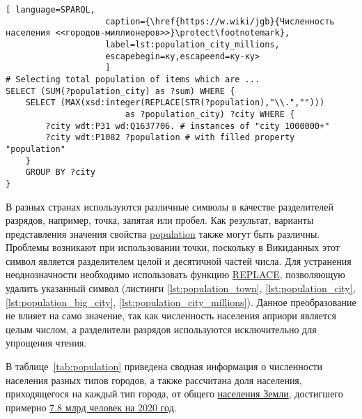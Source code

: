 \begin{lstlisting}[ language=SPARQL, 
                    caption={\href{https://w.wiki/jgb}{Численность населения <<городов-миллионеров>>}\protect\footnotemark},
                    label=lst:population_city_millions, 
                    escapebegin=ку,escapeend=ку-ку>
                    ]
# Selecting total population of items which are ...
SELECT (SUM(?population_city) as ?sum) WHERE {
	SELECT (MAX(xsd:integer(REPLACE(STR(?population),"\\.",""))) 
						as ?population_city) ?city WHERE {
		?city wdt:P31 wd:Q1637706. # instances of "city 1000000+"
		?city wdt:P1082 ?population # with filled property "population"
	}
	GROUP BY ?city
}
\end{lstlisting}

В разных странах используются различные символы в качестве разделителей разрядов, например, точка, запятая или пробел. Как результат, варианты представления значения свойства \href{https://www.wikidata.org/wiki/Property:P1082}{population} также могут быть различны. Проблемы возникают при использовании точки, поскольку в Викиданных этот символ является разделителем целой и десятичной частей числа. Для устранения неоднозначности необходимо использовать функцию \href{https://en.wikibooks.org/wiki/SPARQL/Expressions\_and\_Functions\#REPLACE}{REPLACE}, позволяющую удалить указанный символ (листинги \ref{lst:population_town}, \ref{lst:population_city}, \ref{lst:population_big_city}, \ref{lst:population_city_millions}). Данное преобразование не влияет на само значение, так как численность населения априори является целым числом, а разделители разрядов используются исключительно для упрощения чтения.

В таблице~\ref{tab:population} приведена сводная информация о численности населения разных типов городов, а также рассчитана доля населения, приходящегося на каждый тип города, от общего \href{https://bit.ly/3pgnMss}{населения Земли}, достигшего примерно \href{https://www.gazeta.ru/science/2020/07/16\_a\_13154515.shtml}{\num{7,8} млрд человек на 2020 год}\cite{world_population}.

